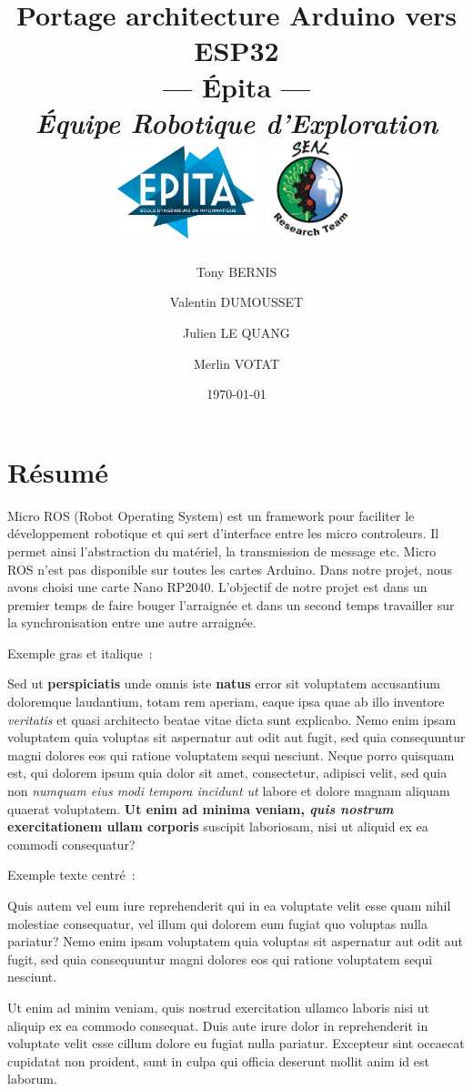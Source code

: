 \documentclass[12pt, a4paper]{report}
\title{\textbf{Portage architecture Arduino vers ESP32} \\ \Large{--- Épita --- \\ \textit{Équipe Robotique d'Exploration}} \\ \vspace{1,5cm} \includegraphics[width=0.3\textwidth]{./img/logo_epita} \includegraphics[width=0.2\textwidth]{./img/logo_equipe_robotique_exploration} \vspace{1,5cm}}
\date{\today}
\author{Tony BERNIS \and Valentin DUMOUSSET \and Julien LE QUANG \and Merlin VOTAT}
\begin{document}
	\maketitle
	
	

	\chapter*{Résumé}

Micro ROS (Robot Operating System) est un framework pour faciliter le développement robotique et qui sert d'interface entre les micro controleurs.
Il permet ainsi l'abstraction du matériel, la transmission de message etc.
Micro ROS n'est pas disponible sur toutes les cartes Arduino. Dans notre projet, nous avons choisi une carte Nano RP2040.
L'objectif de notre projet est dans un premier temps de faire bouger l'arraignée et dans un second temps travailler sur la synchronisation entre une autre arraignée.

Exemple gras et italique~:

Sed ut \textbf{perspiciatis} unde omnis iste \textbf{natus} error sit voluptatem accusantium doloremque laudantium, totam rem aperiam, eaque ipsa quae ab illo inventore \textit{veritatis} et quasi architecto beatae vitae dicta sunt explicabo. Nemo enim ipsam voluptatem quia voluptas sit aspernatur aut odit aut fugit, sed quia consequuntur magni dolores eos qui ratione voluptatem sequi nesciunt. Neque porro quisquam est, qui dolorem ipsum quia dolor sit amet, consectetur, adipisci velit, sed quia non \textit{numquam eius modi tempora incidunt ut} labore et dolore magnam aliquam quaerat voluptatem. \textbf{Ut enim ad minima veniam, \textit{quis nostrum} exercitationem ullam corporis} suscipit laboriosam, nisi ut aliquid ex ea commodi consequatur? 

Exemple texte centré~:

\begin{center}
	Quis autem vel eum iure reprehenderit qui in ea voluptate velit esse quam nihil molestiae consequatur, vel illum qui dolorem eum fugiat quo voluptas nulla pariatur? Nemo enim ipsam voluptatem quia voluptas sit aspernatur aut odit aut fugit, sed quia consequuntur magni dolores eos qui ratione voluptatem sequi nesciunt.
\end{center}

Ut enim ad minim veniam, \color{green} quis nostrud exercitation ullamco \color{black} laboris nisi ut aliquip ex ea commodo consequat. Duis aute irure dolor in reprehenderit in voluptate velit esse cillum dolore eu fugiat nulla pariatur. Excepteur sint occaecat cupidatat non \color{darkblue} proident, sunt in culpa \color{black} qui officia deserunt mollit anim id est laborum.
	
\end{document}
